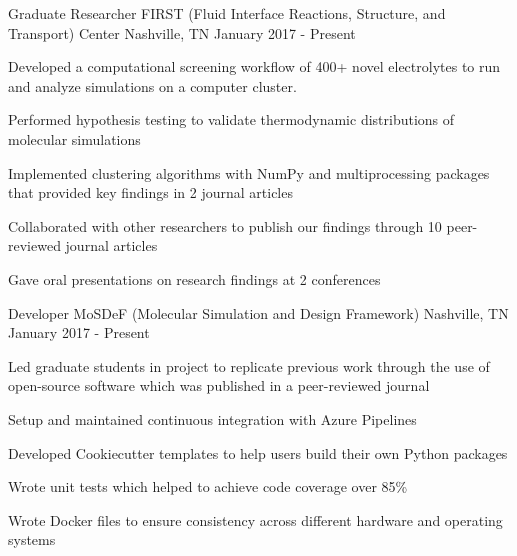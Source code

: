 
\begin{cventries}
  \cventry
    {Graduate Researcher} %
    {FIRST (Fluid Interface Reactions, Structure, and Transport) Center} %
    {Nashville, TN} %
    {January 2017 - Present} %
    {
      \begin{cvitems} %
        \item{Developed a computational screening workflow of 400+ novel electrolytes to
        run \newline
              and analyze simulations on a computer cluster.}
        \item{Performed hypothesis testing to validate thermodynamic
            distributions of molecular simulations}
        \item {Implemented clustering algorithms with NumPy and multiprocessing
            packages that
            provided \newline key findings in 2 journal articles}
        \item {Collaborated with other researchers to publish our findings
            through 10 peer-reviewed journal articles}
        \item{Gave oral presentations on research findings at 2 conferences}
      \end{cvitems}
    }

  \cventry
    {Developer} %
    {MoSDeF (Molecular Simulation and Design Framework)} %
    {Nashville, TN} %
    {January 2017 - Present} %
    {
      \begin{cvitems} %
        \item{Led graduate students in project to replicate previous work
            through \newline the use of open-source software which was published in a
              peer-reviewed journal}
        \item{Setup and maintained continuous integration with Azure Pipelines}
        \item{Developed Cookiecutter templates to help users build 
            their own Python packages}
        \item{Wrote unit tests which helped to achieve code coverage over
            85\%}
        \item{Wrote Docker files to ensure consistency across different hardware
            and operating systems}
      \end{cvitems}
    }
\end{cventries}
